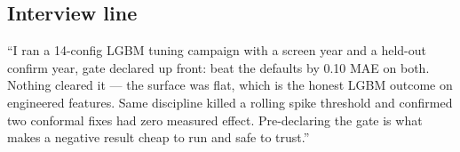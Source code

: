\subsection{Interview line}

``I ran a 14-config LGBM tuning campaign with a screen year and a
held-out confirm year, gate declared up front: beat the defaults by
0.10 MAE on both. Nothing cleared it --- the surface was flat, which
is the honest LGBM outcome on engineered features. Same discipline
killed a rolling spike threshold and confirmed two conformal fixes
had zero measured effect. Pre-declaring the gate is what makes a
negative result cheap to run and safe to trust.''
